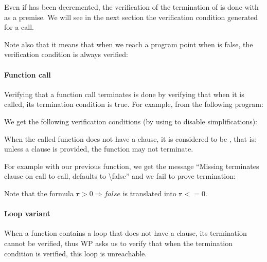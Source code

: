 Even if  has been decremented, the verification of the
termination of  is done with
 as a premise. We will see in the
next section the verification condition generated for a call.



Note also that it means that when we reach a program point when 
is false, the verification condition is always verified:






\paragraph{Function call}



Verifying that a function call terminates is done by verifying that when it is
called, its termination condition is true. For example, from the following
program:





We get the following verification conditions (by using 
to disable simplifications):






When the called function does not have a  clause, it
is considered to be , that is: unless a
 clause is provided, the function may not terminate.


For example with our previous  function, we get the message
``Missing terminates clause on call to call, defaults to \textbackslash{}false''
and we fail to prove termination:




Note that the formula $\mathtt{r} > 0 \Rightarrow false$ is translated into
$\mathtt{r} <= 0$.


\paragraph{Loop variant}



When a function contains a loop that does not have a 
clause, its termination cannot be verified, thus WP asks us to verify that when
the termination condition is verified, this loop is unreachable.



